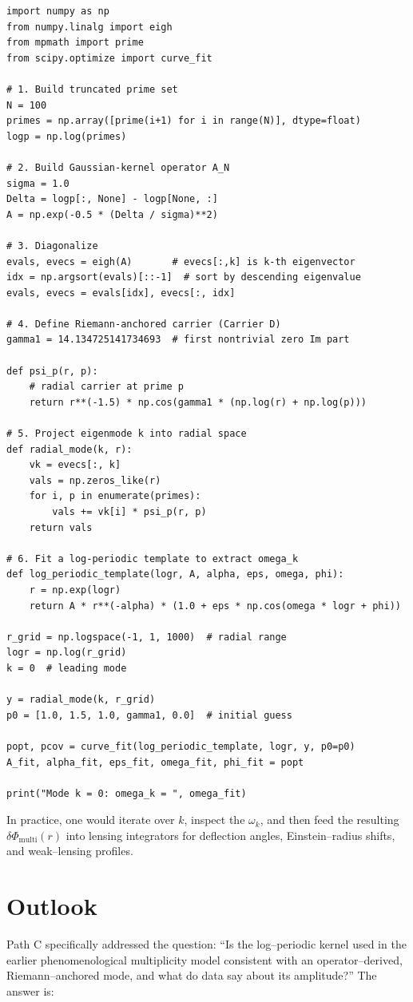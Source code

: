 \documentclass[11pt]{article}
\begin{document}
\begin{verbatim}
import numpy as np
from numpy.linalg import eigh
from mpmath import prime
from scipy.optimize import curve_fit

# 1. Build truncated prime set
N = 100
primes = np.array([prime(i+1) for i in range(N)], dtype=float)
logp = np.log(primes)

# 2. Build Gaussian-kernel operator A_N
sigma = 1.0
Delta = logp[:, None] - logp[None, :]
A = np.exp(-0.5 * (Delta / sigma)**2)

# 3. Diagonalize
evals, evecs = eigh(A)       # evecs[:,k] is k-th eigenvector
idx = np.argsort(evals)[::-1]  # sort by descending eigenvalue
evals, evecs = evals[idx], evecs[:, idx]

# 4. Define Riemann-anchored carrier (Carrier D)
gamma1 = 14.134725141734693  # first nontrivial zero Im part

def psi_p(r, p):
    # radial carrier at prime p
    return r**(-1.5) * np.cos(gamma1 * (np.log(r) + np.log(p)))

# 5. Project eigenmode k into radial space
def radial_mode(k, r):
    vk = evecs[:, k]
    vals = np.zeros_like(r)
    for i, p in enumerate(primes):
        vals += vk[i] * psi_p(r, p)
    return vals

# 6. Fit a log-periodic template to extract omega_k
def log_periodic_template(logr, A, alpha, eps, omega, phi):
    r = np.exp(logr)
    return A * r**(-alpha) * (1.0 + eps * np.cos(omega * logr + phi))

r_grid = np.logspace(-1, 1, 1000)  # radial range
logr = np.log(r_grid)
k = 0  # leading mode

y = radial_mode(k, r_grid)
p0 = [1.0, 1.5, 1.0, gamma1, 0.0]  # initial guess

popt, pcov = curve_fit(log_periodic_template, logr, y, p0=p0)
A_fit, alpha_fit, eps_fit, omega_fit, phi_fit = popt

print("Mode k = 0: omega_k = ", omega_fit)
\end{verbatim}

In practice, one would iterate over $k$, inspect the $\omega_k$, and then feed the resulting $\delta\Phi_{\text{multi}}(r)$ into lensing integrators for deflection angles, Einstein--radius shifts, and weak--lensing profiles.

\section{Outlook}

Path C specifically addressed the question: ``Is the log--periodic kernel used in the earlier phenomenological multiplicity model consistent with an operator--derived, Riemann--anchored mode, and what do data say about its amplitude?'' The answer is:
\end{document}
